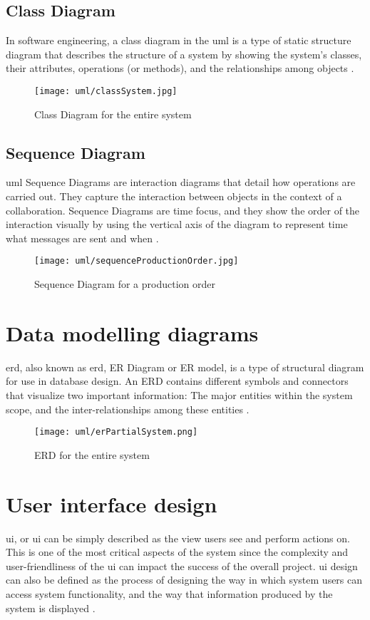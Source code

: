 \documentclass[12pt]{report}
\begin{document}
\newpage
\subsection{Class Diagram}
In software engineering, a class diagram in the \acrfull{uml} is a type of static structure diagram that describes the structure of a system by showing the system's classes, their attributes, operations (or methods), and the relationships among objects \cite{vparadigm_2018_uml}.

\begin{figure}[H]
	\centering
	\texttt{[image: uml/classSystem.jpg]}
	\caption{Class Diagram for the entire system}
\end{figure}

\newpage
\subsection{Sequence Diagram}
\acrshort{uml} Sequence Diagrams are interaction diagrams that detail how operations are carried out. They capture the interaction between objects in the context of a collaboration. Sequence Diagrams are time focus, and they show the order of the interaction visually by using the vertical axis of the diagram to represent time what messages are sent and when \cite{vparadigm_2018_uml}.

\begin{figure}[H]
	\centering
	\texttt{[image: uml/sequenceProductionOrder.jpg]}
	\caption{Sequence Diagram for a production order}
\end{figure}

\section{Data modelling diagrams}
\acrlong{erd}, also known as \acrshort{erd}, ER Diagram or ER model, is a type of structural diagram for use in database design. An ERD contains different symbols and connectors that visualize two important information: The major entities within the system scope, and the inter-relationships among these entities \cite{vparadigm_2018_uml}.

\begin{figure}[H]
	\centering
	\texttt{[image: uml/erPartialSystem.png]}
	\caption{ERD for the entire system}
\end{figure}

\newpage
\section{User interface design}
\acrlong{ui}, or \acrshort{ui} can be simply described as the view users see and perform actions on. This is one of the most critical aspects of the system since the complexity and user-­friendliness of the \acrshort{ui} can impact the success of the overall project. \acrshort{ui} design can also be defined as the process of designing the way in which system users can access system functionality, and the way that information produced by the system is displayed \cite{sommerville_2008_se}.
\end{document}
